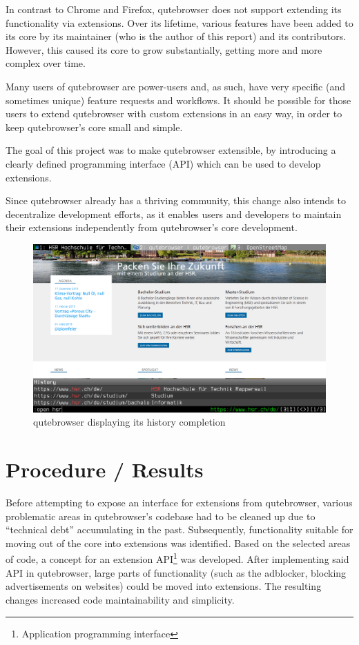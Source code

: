In contrast to Chrome and Firefox, qutebrowser does not support extending its
functionality via extensions. Over its lifetime, various features have been
added to its core by its maintainer (who is the author of this report) and its
contributors. However, this caused its core to grow substantially, getting more
and more complex over time.

Many users of qutebrowser are power-users and, as such, have very specific (and
sometimes unique) feature requests and workflows. It should be possible for
those users to extend qutebrowser with custom extensions in an easy way, in
order to keep qutebrowser's core small and simple.

The goal of this project was to make qutebrowser extensible, by introducing a
clearly defined programming interface (API) which can be used to develop
extensions.

Since qutebrowser already has a thriving community, this change also intends to
decentralize development efforts, as it enables users and developers to maintain
their extensions independently from qutebrowser's core development.

\begin{figure}[H]
\includegraphics[width=\linewidth]{img/screenshot-intro.png}
\caption{qutebrowser displaying its history completion}
\end{figure}

\section*{Procedure / Results}
Before attempting to expose an interface for extensions from qutebrowser,
various problematic areas in qutebrowser's codebase had to be cleaned up due to
``technical debt'' accumulating in the past. Subsequently, functionality
suitable for moving out of the core into extensions was identified. Based on
the selected areas of code, a concept for an extension API\footnote{Application
programming interface} was developed. After implementing said API in
qutebrowser, large parts of functionality (such as the adblocker, blocking
advertisements on websites) could be moved into extensions. The resulting
changes increased code maintainability and simplicity.

